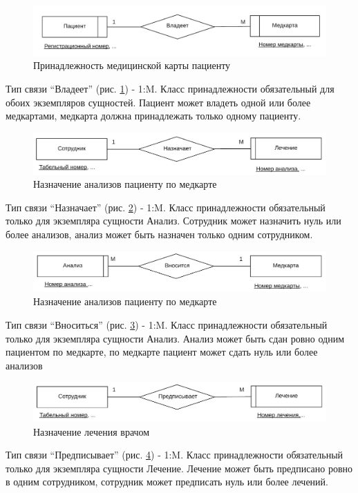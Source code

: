 \documentclass[14pt,a4paper,russian]{extreport}
\begin{document}
\begin{figure}[h!]
        \includegraphics[width=\textwidth]{medcbelpat}
        \caption{Принадлежность медицинской карты пациенту}
        \label{fig:medcbelpat}
\end{figure}

Тип связи ``Владеет'' (рис. \ref{fig:medcbelpat}) - 1:M.
Класс принадлежности обязательный для обоих экземпляров сущностей.
Пациент может владеть одной или более медкартами, медкарта должна принадлежать
только одному пациенту.
\cleardoublepage

\begin{figure}[h!]
        \includegraphics[width=\textwidth]{cardan}
        \caption{Назначение анализов пациенту по медкарте}
        \label{fig:cardan}
\end{figure}
Тип связи ``Назначает'' (рис. \ref{fig:cardan}) - 1:M.
Класс принадлежности обязательный только для экземпляра сущности Анализ.
Сотрудник может назначить нуль или более анализов, анализ может
быть назначен только одним сотрудником.

\begin{figure}[h!]
        \includegraphics[width=\textwidth]{newcardan}
        \caption{Назначение анализов пациенту по медкарте}
        \label{fig:newcardan}
\end{figure}

Тип связи ``Вноситься'' (рис. \ref{fig:newcardan}) - 1:M.
Класс принадлежности обязательный только для экземпляра сущности Анализ.
Анализ может быть сдан ровно одним пациентом по медкарте, по
медкарте пациент может сдать нуль или более анализов

\begin{figure}[h!]
        \includegraphics[width=\textwidth]{empcure}
        \caption{Назначение лечения врачом}
        \label{fig:empcure}
\end{figure}
Тип связи ``Предписывает'' (рис. \ref{fig:empcure}) - 1:M.
Класс принадлежности обязательный только для экземпляра сущности Лечение.
Лечение может быть предписано ровно в одним сотрудником, сотрудник
может предписать нуль или более лечений.
\end{document}
